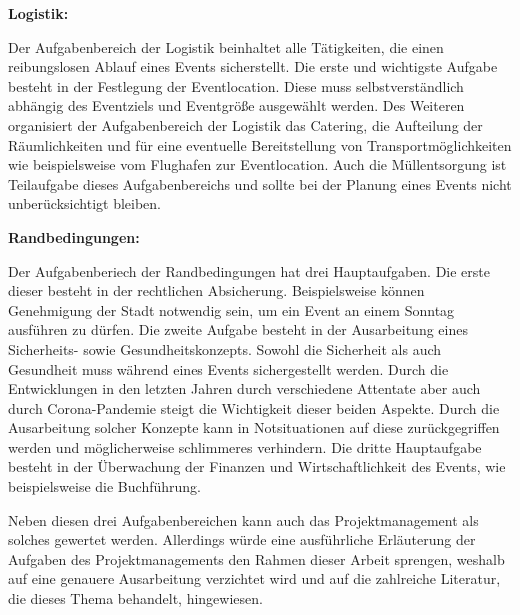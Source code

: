 \textbf{Logistik:}

Der Aufgabenbereich der Logistik beinhaltet alle Tätigkeiten, die einen reibungslosen Ablauf eines Events sicherstellt. Die erste und wichtigste Aufgabe besteht in der Festlegung der Eventlocation. Diese muss selbstverständlich abhängig des Eventziels und Eventgröße ausgewählt werden. Des Weiteren organisiert der Aufgabenbereich der Logistik das Catering, die Aufteilung der Räumlichkeiten und für eine eventuelle Bereitstellung von Transportmöglichkeiten wie beispielsweise vom Flughafen zur Eventlocation. Auch die Müllentsorgung ist Teilaufgabe dieses Aufgabenbereichs und sollte bei der Planung eines Events nicht unberücksichtigt bleiben.

\textbf{Randbedingungen:}

Der Aufgabenberiech der Randbedingungen hat drei Hauptaufgaben. Die erste dieser besteht in der rechtlichen Absicherung. Beispielsweise können Genehmigung der Stadt notwendig sein, um ein Event an einem Sonntag ausführen zu dürfen. Die zweite Aufgabe besteht in der Ausarbeitung eines Sicherheits- sowie Gesundheitskonzepts. Sowohl die Sicherheit als auch Gesundheit muss während eines Events sichergestellt werden. Durch die Entwicklungen in den letzten Jahren durch verschiedene Attentate aber auch durch Corona-Pandemie steigt die Wichtigkeit dieser beiden Aspekte. Durch die Ausarbeitung solcher Konzepte kann in Notsituationen auf diese zurückgegriffen werden und möglicherweise schlimmeres verhindern. Die dritte Hauptaufgabe besteht in der Überwachung der Finanzen und Wirtschaftlichkeit des Events, wie beispielsweise die Buchführung.

Neben diesen drei Aufgabenbereichen kann auch das Projektmanagement als solches gewertet werden. Allerdings würde eine ausführliche Erläuterung der Aufgaben des Projektmanagements den Rahmen dieser Arbeit sprengen, weshalb auf eine genauere Ausarbeitung verzichtet wird und auf die zahlreiche Literatur, die dieses Thema behandelt, hingewiesen.
